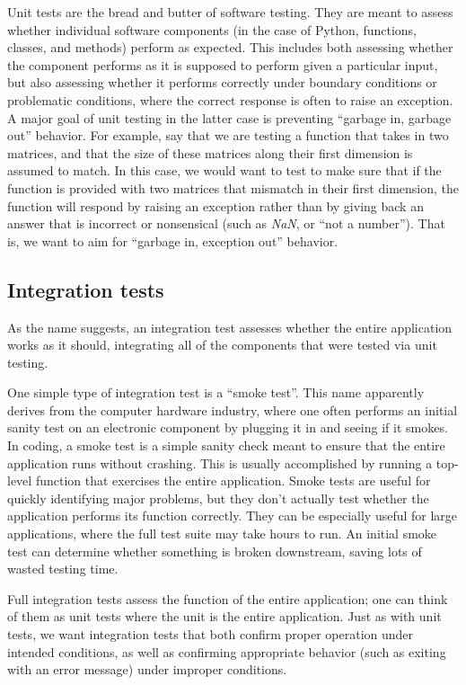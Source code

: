 Unit tests are the bread and butter of software testing.
They are meant to assess whether individual software components (in the case of Python, functions, classes, and methods) perform as expected.
This includes both assessing whether the component performs as it is supposed to perform given a particular input, but also assessing whether it performs correctly under boundary conditions or problematic conditions, where the correct response is often to raise an exception.
A major goal of unit testing in the latter case is preventing ``garbage in, garbage out'' behavior.
For example, say that we are testing a function that takes in two matrices, and that the size of these matrices along their first dimension is assumed to match.
In this case, we would want to test to make sure that if the function is provided with two matrices that mismatch in their first dimension, the function will respond by raising an exception rather than by giving back an answer that is incorrect or nonsensical (such as \textit{NaN}, or ``not a number'').
That is, we want to aim for ``garbage in, exception out'' behavior.

\subsection{Integration tests}

As the name suggests, an integration test assesses whether the entire application works as it should, integrating all of the components that were tested via unit testing.

One simple type of integration test is a ``smoke test''.
This name apparently derives from the computer hardware industry, where one often performs an initial sanity test on an electronic component by plugging it in and seeing if it smokes.
In coding, a smoke test is a simple sanity check meant to ensure that the entire application runs without crashing.
This is usually accomplished by running a top-level function that exercises the entire application.
Smoke tests are useful for quickly identifying major problems, but they don't actually test whether the application performs its function correctly.
They can be especially useful for large applications, where the full test suite may take hours to run.
An initial smoke test can determine whether something is broken downstream, saving lots of wasted testing time.

Full integration tests assess the function of the entire application; one can think of them as unit tests where the unit is the entire application.
Just as with unit tests, we want integration tests that both confirm proper operation under intended conditions, as well as confirming appropriate behavior (such as exiting with an error message) under improper conditions.

